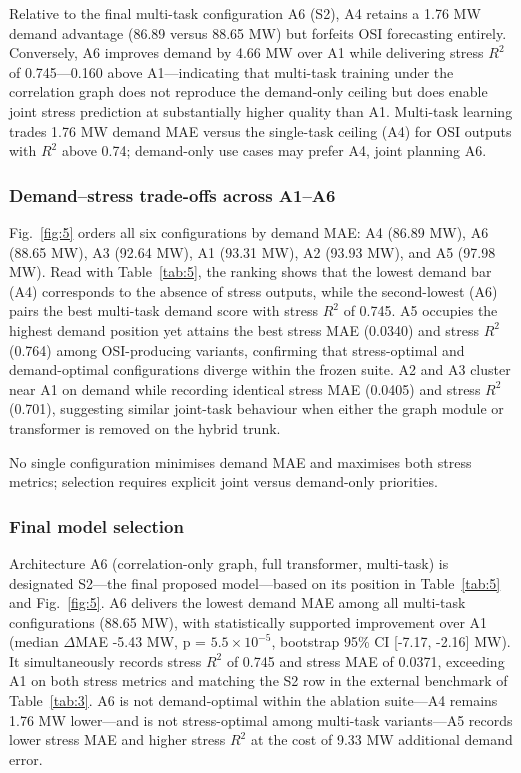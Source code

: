 Relative to the final multi-task configuration A6 (S2), A4 retains a 1.76 MW demand advantage (86.89 versus 88.65 MW) but forfeits OSI forecasting entirely. Conversely, A6 improves demand by 4.66 MW over A1 while delivering stress $R^2$ of 0.745---0.160 above A1---indicating that multi-task training under the correlation graph does not reproduce the demand-only ceiling but does enable joint stress prediction at substantially higher quality than A1. Multi-task learning trades 1.76 MW demand MAE versus the single-task ceiling (A4) for OSI outputs with $R^2$ above 0.74; demand-only use cases may prefer A4, joint planning A6.

\subsubsection{Demand–stress trade-offs across A1–A6}\label{subsubsection:demand_stress_trade_offs_across_a1_a6}

Fig.~\ref{fig:5} orders all six configurations by demand MAE: A4 (86.89 MW), A6 (88.65 MW), A3 (92.64 MW), A1 (93.31 MW), A2 (93.93 MW), and A5 (97.98 MW). Read with Table~\ref{tab:5}, the ranking shows that the lowest demand bar (A4) corresponds to the absence of stress outputs, while the second-lowest (A6) pairs the best multi-task demand score with stress $R^2$ of 0.745. A5 occupies the highest demand position yet attains the best stress MAE (0.0340) and stress $R^2$ (0.764) among OSI-producing variants, confirming that stress-optimal and demand-optimal configurations diverge within the frozen suite. A2 and A3 cluster near A1 on demand while recording identical stress MAE (0.0405) and stress $R^2$ (0.701), suggesting similar joint-task behaviour when either the graph module or transformer is removed on the hybrid trunk.

No single configuration minimises demand MAE and maximises both stress metrics; selection requires explicit joint versus demand-only priorities.

\subsubsection{Final model selection}\label{subsubsection:final_model_selection}

Architecture A6 (correlation-only graph, full transformer, multi-task) is designated S2---the final proposed model---based on its position in Table~\ref{tab:5} and Fig.~\ref{fig:5}. A6 delivers the lowest demand MAE among all multi-task configurations (88.65 MW), with statistically supported improvement over A1 (median $\Delta$MAE -5.43 MW, p = $5.5 \times 10^{-5}$, bootstrap 95\% CI [-7.17, -2.16] MW). It simultaneously records stress $R^2$ of 0.745 and stress MAE of 0.0371, exceeding A1 on both stress metrics and matching the S2 row in the external benchmark of Table~\ref{tab:3}. A6 is not demand-optimal within the ablation suite---A4 remains 1.76 MW lower---and is not stress-optimal among multi-task variants---A5 records lower stress MAE and higher stress $R^2$ at the cost of 9.33 MW additional demand error.

